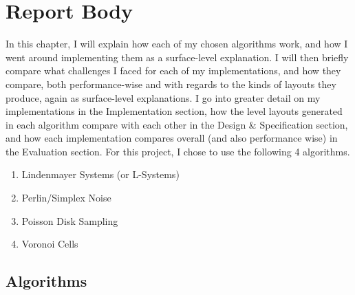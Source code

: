 \chapter{Report Body}

In this chapter, I will explain how each of my chosen algorithms work, and how I went around implementing them as a surface-level explanation. I will then briefly compare what challenges I faced for each of my implementations, and how they compare, both performance-wise and with regards to the kinds of layouts they produce, again as surface-level explanations. I go into greater detail on my implementations in the Implementation section, how the level layouts generated in each algorithm compare with each other in the Design \& Specification section, and how each implementation compares overall (and also performance wise) in the Evaluation section. For this project, I chose to use the following 4 algorithms.

\begin{enumerate}
    \item Lindenmayer Systems (or L-Systems)
    \item Perlin/Simplex Noise
    \item Poisson Disk Sampling
    \item Voronoi Cells
\end{enumerate}

\section{Algorithms}


